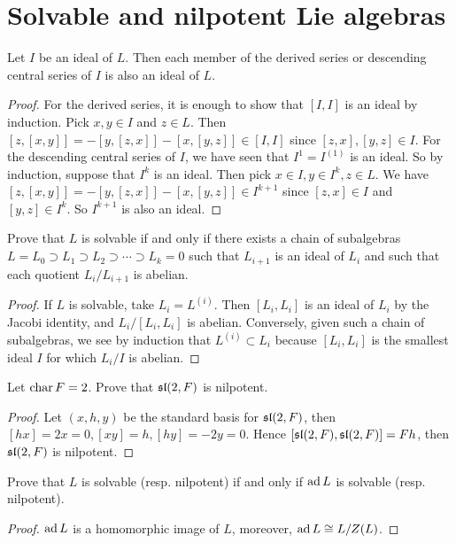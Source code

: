 \section{Solvable and nilpotent Lie algebras}



\begin{ex}\label{3.1}
  Let $I$ be an ideal of $L$. Then each member of the derived series or descending central series of $I$ is also an ideal of $L$.
\end{ex}
\begin{proof}
  For the derived series, it is enough to show that $[I, I]$ is an ideal by induction. Pick $x, y \in I$ and $z \in L$. Then
  $[z, [x, y]] = -[y, [z, x]] - [x, [y, z]] \in [I, I]$
  since $[z, x], [y, z] \in I$. For the descending central series of $I$, we have seen that $I^1 = I^{(1)}$ is an ideal. So by induction, suppose that $I^k$ is an ideal. Then pick $x \in I, y \in I^k, z \in L$. We have $[z, [x, y]] = -[y, [z, x]]-[x, [y, z]] \in I^{k+1}$ since $[z, x] \in I$ and $[y, z] \in I^k$. So $I^{k+1}$ is also an ideal.
\end{proof}

\begin{ex}
  Prove that $L$ is solvable if and only if there exists a chain of subalgebras $L = L_0 \supset L_1 \supset L_2 \supset \cdots \supset L_k = 0$ such that $L_{i+1}$ is an ideal of $L_i$ and such that each quotient $L_i/L_{i+1}$ is abelian.
\end{ex}
\begin{proof}
  If $L$ is solvable, take $L_i = L^{(i)}$. Then $[L_i,L_i]$ is an ideal of $L_i$ by the Jacobi identity, and $L_i/[L_i,L_i]$ is abelian. Conversely, given such a chain of subalgebras, we see by induction that $L^(i) \subset L_i$ because $[L_i,L_i]$ is the smallest ideal $I$ for which $L_i/I$ is abelian.
\end{proof}

\begin{ex}\label{3.3}
  Let $\Char F = 2$. Prove that $\sl(2, F)$ is nilpotent.
\end{ex}
\begin{proof}
  Let $(x, h, y)$ be the standard basis for $\sl(2, F)$, then $[hx] = 2x = 0, [xy] = h, [hy] = -2y = 0$. Hence $[\sl(2, F), \sl(2, F)] = Fh$, then $\sl(2,F)$ is nilpotent.
\end{proof}

\begin{ex}
  Prove that $L$ is solvable (resp. nilpotent) if and only if $\ad L$ is solvable (resp. nilpotent).
\end{ex}
\begin{proof}
  $\ad L$ is a homomorphic image of $L$, moreover, $\ad L\cong L/Z(L)$.
\end{proof}

